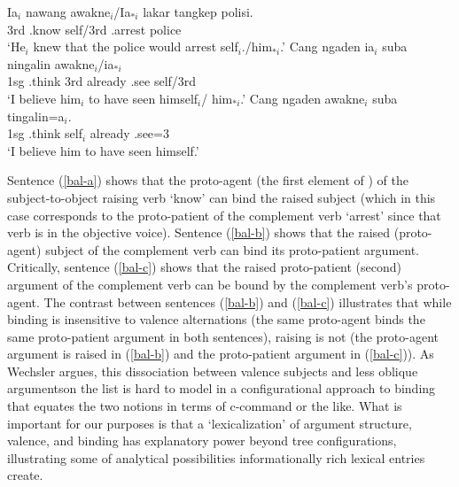 \documentclass[output=paper]{langsci/langscibook}
\begin{document}
\begin{exe}
	\ex\label{bal}
	\begin{xlist} 
		\ex\label{bal-a}
		\gll Ia$_{i}$ nawang {awakne$_{i}$/Ia$_{*i}$ } lakar tangkep polisi. \\
		3rd .know self/3rd  .arrest police  \\
		\glt `He$_{i}$ knew that the police would arrest self$_{i}$./him$_{*i}$.'
		\ex\label{bal-b}
		\gll Cang ngaden ia$_{i}$ suba ningalin awakne$_{i}$/ia$_{*i}$ \\
		1sg .think 3rd already .see self/3rd \\
		\glt `I believe him$_{i}$ to have seen himself$_{i}$/ him$_{*i}$.'
		\ex\label{bal-c}
		\gll Cang ngaden awakne$_{i}$ suba tingalin=a$_{i}$.\\
		1sg .think self$_{i}$ already .see=3 \\
		\glt `I believe him to have seen himself.'
	\end{xlist}
\end{exe} 

Sentence (\ref{bal-a}) shows that the proto-agent (the first element of ) of the subject-to-object raising verb  `know' can bind the raised subject (which in this case corresponds to the proto-patient of the complement verb  `arrest' since that verb is in the objective voice). Sentence (\ref{bal-b}) shows that the raised (proto-agent) subject of the complement verb can bind its proto-patient argument. Critically, sentence (\ref{bal-c}) shows that the raised proto-patient (second) argument of the complement verb can be bound by the complement verb's proto-agent. The contrast between sentences (\ref{bal-b}) and (\ref{bal-c}) illustrates that while binding is insensitive to valence alternations (the same proto-agent binds the same proto-patient argument in both sentences), raising is not (the proto-agent argument is raised in (\ref{bal-b}) and the proto-patient argument in (\ref{bal-c})). As Wechsler argues, this dissociation between valence subjects and less oblique argumentson the  list is hard to model in a configurational approach to binding that equates the two notions in terms of c-command or the like. What is important for our purposes is that a `lexicalization' of argument structure, valence, and binding has explanatory power beyond tree configurations, illustrating some of analytical possibilities informationally rich lexical entries create. 
\end{document}
